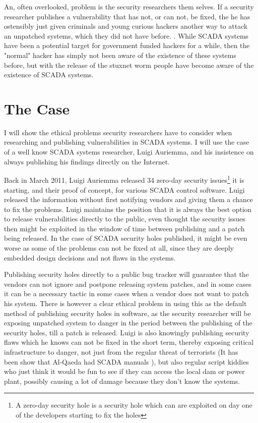 An, often overlooked, problem is the security researchers them selves. If a security researcher publishes a vulnerability that has not, or can not, be fixed, the he has ostensibly just given criminals and young curious hackers another way to attack an unpatched systems, which they did not have before. \cite{v1, v2, v3, v5, v6, v7, v8, v9}. 
While SCADA systems have been a potential target for government funded hackers for a while, then the "normal" hacker has simply not been aware of the existence of these systems before, but with the release of the stuxnet worm \cite{v4} people have become aware of the existence of SCADA systems.



\section{The Case}

I will show the ethical problems security researchers have to consider when researching and publishing vulnerabilities in SCADA systems. I will use the case of a well know SCADA systems researcher, Luigi Auriemma, and his insistence on always publishing his findings directly on the Internet.

Back in March 2011, Luigi Auriemma released 34 zero-day security issues\footnote{A zero-day security hole is a security hole which can are exploited on day one of the developers starting to fix the holes} it is starting, and their proof of concept, for various SCADA control software. Luigi released the information without first notifying vendors and giving them a chance to fix the problems. Luigi maintains the position that it is always the best option to release vulnerabilities directly to the public, even thought the security issues then might be exploited in the window of time between publishing and a patch being released. In the case of SCADA security holes published, it might be even worse as some of the problems can not be fixed at all, since they are deeply embedded design decisions and not flaws in the systems.

Publishing security holes directly to a public bug tracker will guarantee that the vendors can not ignore and postpone releasing system patches, and in some cases it can be a necessary tactic in some cases when a vendor does not want to patch his system. There is however a clear ethical problem in using this as the default method of publishing security holes in software, as the security researcher will be exposing unpatched system to danger in the period between the publishing of the security holes, till a patch is released.
Luigi is also knowingly publishing security flaws which he knows can not be fixed in the short term, thereby exposing critical infrastructure to danger, not just from the regular threat of terrorists (It has been show that Al-Qaeda had SCADA manuals \cite{v13}), but also regular script kiddies who just think it would be fun to see if they can access the local dam or power plant, possibly causing a lot of damage because they don't know the systems.

